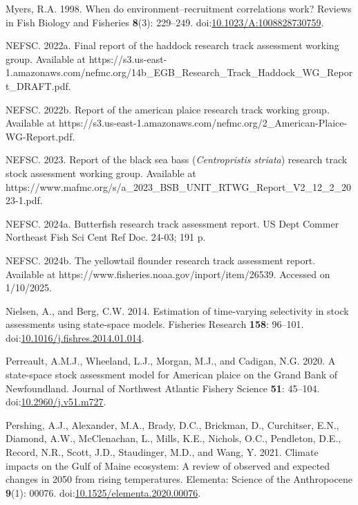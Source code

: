 \documentclass[
]{article}
\newlength{\cslhangindent}
\newlength{\cslentryspacingunit} %
\newenvironment{CSLReferences}[2] %
 {%
  \setlength{\parindent}{0pt}
  \ifodd #1
  \let\oldpar\par
  \def\par{\hangindent=\cslhangindent\oldpar}
  \fi
  \setlength{\parskip}{#2\cslentryspacingunit}
 }%
 {}
\begin{document}
\begin{CSLReferences}{1}{0}
\leavevmode{}%
Myers, R.A. 1998. When do environment--recruitment correlations work? Reviews in Fish Biology and Fisheries \textbf{8}(3): 229--249. doi:\href{https://doi.org/10.1023/A:1008828730759}{10.1023/A:1008828730759}.

\leavevmode{}%
NEFSC. 2022a. Final report of the haddock research track assessment working group. {Available} at https://s3.us-east-1.amazonaws.com/nefmc.org/14b\_EGB\_Research\_Track\_Haddock\_WG\_Report\_DRAFT.pdf.

\leavevmode{}%
NEFSC. 2022b. Report of the american plaice research track working group. {Available} at https://s3.us-east-1.amazonaws.com/nefmc.org/2\_American-Plaice-WG-Report.pdf.

\leavevmode{}%
NEFSC. 2023. Report of the black sea bass (\emph{{C}entropristis} \emph{striata}) research track stock assessment working group. {Available} at https://www.mafmc.org/s/a\_2023\_BSB\_UNIT\_RTWG\_Report\_V2\_12\_2\_2023-1.pdf.

\leavevmode{}%
NEFSC. 2024a. Butterfish research track assessment report. US Dept Commer Northeast Fish Sci Cent Ref Doc. 24-03; 191 p.

\leavevmode{}%
NEFSC. 2024b. The yellowtail flounder research track assessment report. {Available} at https://www.fisheries.noaa.gov/inport/item/26539. Accessed on 1/10/2025.

\leavevmode{}%
Nielsen, A., and Berg, C.W. 2014. Estimation of time-varying selectivity in stock assessments using state-space models. Fisheries Research \textbf{158}: 96--101. doi:\href{https://doi.org/10.1016/j.fishres.2014.01.014}{10.1016/j.fishres.2014.01.014}.

\leavevmode{}%
Perreault, A.M.J., Wheeland, L.J., Morgan, M.J., and Cadigan, N.G. 2020. A state-space stock assessment model for {American} plaice on the {Grand} {Bank} of {Newfoundland}. Journal of Northwest Atlantic Fishery Science \textbf{51}: 45--104. doi:\href{https://doi.org/10.2960/j.v51.m727}{10.2960/j.v51.m727}.

\leavevmode{}%
Pershing, A.J., Alexander, M.A., Brady, D.C., Brickman, D., Curchitser, E.N., Diamond, A.W., McClenachan, L., Mills, K.E., Nichols, O.C., Pendleton, D.E., Record, N.R., Scott, J.D., Staudinger, M.D., and Wang, Y. 2021. Climate impacts on the {G}ulf of {M}aine ecosystem: A review of observed and expected changes in 2050 from rising temperatures. Elementa: Science of the Anthropocene \textbf{9}(1): 00076. doi:\href{https://doi.org/10.1525/elementa.2020.00076}{10.1525/elementa.2020.00076}.


\end{CSLReferences}
\end{document}

